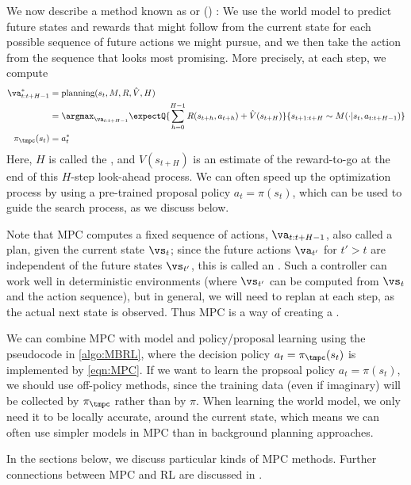 We now describe a method
 known as 
or  ()
\citep{Mayne1990,Camacho2013,Rawlings2022}:
We use the world model to predict future states and rewards that might  follow
from the current state
for each possible sequence of future actions we might pursue,
and we then take the action from the sequence that looks most promising.
More precisely, at each step, we compute
\begin{align}
  \va_{t:t+H-1}^* &=  \text{planning}(s_t, M, R, \hat{V}, H) \\
  &= \argmax_{\va_{t:t+H-1}}
\expectQ{\sum_{h=0}^{H-1} R(s_{t+h}, a_{t+h}) + \hat{V}(s_{t+H})}
{s_{t+1:t+H} \sim M(\cdot|s_t, a_{t:t+H-1})} 
\label{eqn:MPC} \\
\pi_{\tmpc}(s_t) &= a_t^*
\end{align}
Here, $H$ is called the ,
and $\hat{V}(s_{t+H})$ is an estimate of the reward-to-go
at the end of this $H$-step look-ahead process.
We can often speed up the optimization process
by using a pre-trained proposal policy $a_t=\pi(s_t)$,
which can be used to guide the search process, as we discuss below.

Note that MPC computes a fixed sequence of actions, $\va_{t:t+H-1}$,
also called a plan,  given the current state $\vs_t$;
since the future actions $\va_{t'}$ for $t'>t$
are independent of the future states $\vs_{t'}$,
this is called an .
Such a controller can work well in deterministic environments
(where $\vs_{t'}$ can be computed from $\vs_t$ and the action sequence),
but in general, we will need to replan at each step,
as the actual next state is observed.
Thus MPC is a way of creating
a .


We can combine MPC with model and policy/proposal learning
using the  pseudocode in \cref{algo:MBRL},
where the decision policy $a_t = \pi_{\tmpc}(s_t)$ is implemented
by \cref{eqn:MPC}.
If we want to learn the propsoal policy
$a_t=\pi(s_t)$, we should use off-policy methods,
since the training data (even if imaginary)
will be collected by $\pi_{\tmpc}$
rather than by $\pi$.
When learning the world model,
we only need it to be
locally accurate, around the current state,
which means we can often use simpler models in MPC
than in background planning approaches.

In the sections below, we discuss particular kinds of MPC methods.
Further connections between MPC and RL
are discussed in \citep{Bertsekas2024MPC}.


